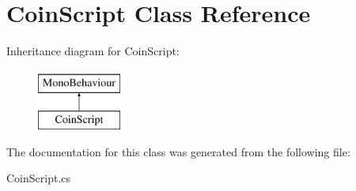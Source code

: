 \hypertarget{classCoinScript}{\section{Coin\-Script Class Reference}
\label{classCoinScript}
}
Inheritance diagram for Coin\-Script\-:\begin{figure}[H]
\begin{center}
\leavevmode
\includegraphics[height=2.000000cm]{classCoinScript}
\end{center}
\end{figure}


The documentation for this class was generated from the following file\-:\begin{DoxyCompactItemize}
\item 
Coin\-Script.\-cs\end{DoxyCompactItemize}
